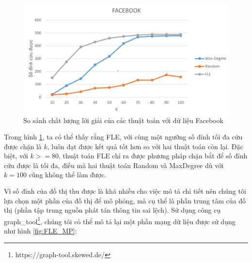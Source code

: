 \begin{itemize}
	\begin{center}
		\begin{figure}[htp]
			\begin{center}
				\includegraphics [scale = 1.2]{picture/FLE/FB_res}
			\end{center}
			\caption{So sánh chất lượng lời giải của các thuật toán với dữ liệu Facebook}
			\label{fig:FLE_FB}
		\end{figure}
	\end{center}	
	Trong hình \ref{fig:FLE_FB}, ta có thể thấy rằng FLE, với cùng một ngưỡng số đỉnh tối đa cứu được chặn là $k$, luôn đạt được kết quả tốt hơn so với hai thuật toán còn lại. Đặc biệt, với $k>=80$, thuật toán FLE chỉ ra được phương pháp chặn bắt để số đỉnh cứu được là tối đa, điều mà hai thuật toán Random và MaxDegree dù với $k=100$ cũng không thể làm được.
	
	Vì số đỉnh của đồ thị thu được là khá nhiều cho việc mô tả chỉ tiết nên chúng tôi lựa chọn một phần của đồ thị để mô phỏng, mà cụ thể là phần trung tâm của đồ thị (phần tập trung nguồn phát tán thông tin sai lệch). Sử dụng công cụ graph\_tool\footnote{https://graph-tool.skewed.de/}, chúng tôi cỏ thể mô tả lại một phần mạng dữ liệu được sử dụng như hình \ref{fig:FLE_MP}:
	

\end{itemize}
